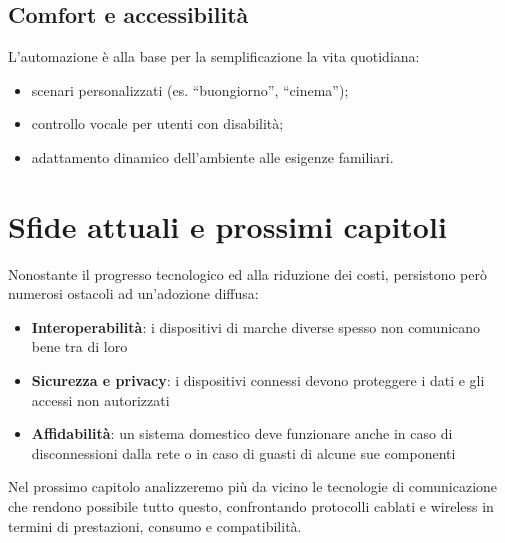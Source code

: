 \subsection{Comfort e accessibilità}

L'automazione è alla base per la semplificazione la vita quotidiana:

\begin{itemize}
    \item scenari personalizzati (es. “buongiorno”, “cinema”);
    \item controllo vocale per utenti con disabilità;
    \item adattamento dinamico dell’ambiente alle esigenze familiari.
\end{itemize}

\section{Sfide attuali e prossimi capitoli}

Nonostante il progresso tecnologico ed alla riduzione dei costi, persistono però numerosi ostacoli ad un'adozione diffusa:

\begin{itemize}
    \item \textbf{Interoperabilità}: i dispositivi di marche diverse spesso non comunicano bene tra di loro
    \item \textbf{Sicurezza e privacy}: i dispositivi connessi devono proteggere i dati e gli accessi non autorizzati
    \item \textbf{Affidabilità}: un sistema domestico deve funzionare anche in caso di disconnessioni dalla rete o in caso di guasti di alcune sue componenti
\end{itemize}

Nel prossimo capitolo analizzeremo più da vicino le tecnologie di comunicazione che rendono possibile tutto questo, confrontando protocolli cablati e wireless in termini di prestazioni, consumo e compatibilità.

